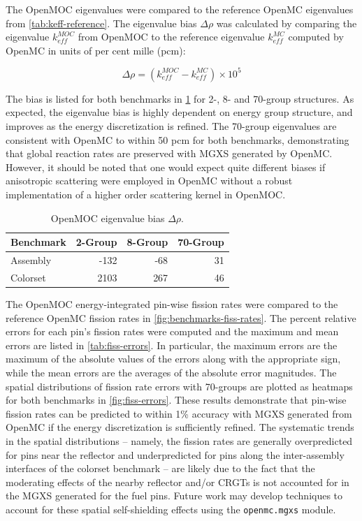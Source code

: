 The OpenMOC eigenvalues were compared to the reference OpenMC eigenvalues from \cref{tab:keff-reference}. The eigenvalue bias $\Delta\rho$ was calculated by comparing the eigenvalue $k_{eff}^{MOC}$ from OpenMOC to the reference eigenvalue $k_{eff}^{MC}$ computed by OpenMC in units of per cent mille (pcm):

\begin{equation}
\label{eqn:delta-rho}
\Delta\rho = \left(k_{eff}^{MOC} - k_{eff}^{MC}\right) \times 10^{5}
\end{equation}

The bias is listed for both benchmarks in \cref{tab:keff-bias} for 2-, 8- and 70-group structures. As expected, the eigenvalue bias is highly dependent on energy group structure, and improves as the energy discretization is refined. The 70-group eigenvalues are consistent with OpenMC to within 50 pcm for both benchmarks, demonstrating that global reaction rates are preserved with MGXS generated by OpenMC. However, it should be noted that one would expect quite different biases if anisotropic scattering were employed in OpenMC without a robust implementation of a higher order scattering kernel in OpenMOC.

\begin{table}[h!]
  \centering
  \caption{OpenMOC eigenvalue bias $\Delta\rho$.}
  \label{tab:keff-bias} 
  \begin{tabular}{l r r r}
  \toprule
  \textbf{Benchmark} & \textbf{2-Group} & \textbf{8-Group} & \textbf{70-Group} \\
  \midrule
  Assembly & -132 & -68 & 31 \\
  \midrule
  Colorset & 2103 & 267 & 46 \\
  \bottomrule
\end{tabular}
\end{table}

The OpenMOC energy-integrated pin-wise fission rates were compared to the reference OpenMC fission rates in \cref{fig:benchmarks-fiss-rates}. The percent relative errors for each pin's fission rates were computed and the maximum and mean errors are listed in \cref{tab:fiss-errors}. In particular, the maximum errors are the maximum of the absolute values of the errors along with the appropriate sign, while the mean errors are the averages of the absolute error magnitudes. The spatial distributions of fission rate errors with 70-groups are plotted as heatmaps for both benchmarks in \cref{fig:fiss-errors}. These results demonstrate that pin-wise fission rates can be predicted to within 1\% accuracy with MGXS generated from OpenMC if the energy discretization is sufficiently refined. The systematic trends in the spatial distributions -- namely, the fission rates are generally overpredicted for pins near the reflector and underpredicted for pins along the inter-assembly interfaces of the colorset benchmark -- are likely due to the fact that the moderating effects of the nearby reflector and/or CRGTs is not accounted for in the MGXS generated for the fuel pins. Future work may develop techniques to account for these spatial self-shielding effects using the \texttt{openmc.mgxs} module.


